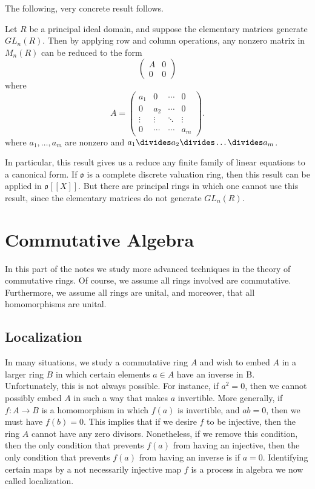 The following, very concrete result follows.

\begin{theorem}
    Let $R$ be a principal ideal domain, and suppose the elementary matrices generate $GL_n(R)$. Then by applying row and column operations, any nonzero matrix in $M_n(R)$ can be reduced to the form
    \[ \begin{pmatrix}
            A & 0 \\ 0 & 0
    \end{pmatrix} \]
    where
    \[ A = \begin{pmatrix} a_1 & 0 & \cdots & 0 \\ 0 & a_2 & \cdots & 0 \\ \vdots & \vdots & \ddots & \vdots \\ 0 & \cdots & \cdots & a_m \end{pmatrix}. \]
    where $a_1,\dots,a_m$ are nonzero and $a_1 \divides a_2 \divides \dots \divides a_m$.
\end{theorem}

In particular, this result gives us a reduce any finite family of linear equations to a canonical form. If $\mathfrak{o}$ is a complete discrete valuation ring, then this result can be applied in $\mathfrak{o}[[X]]$. But there are principal rings in which one cannot use this result, since the elementary matrices do not generate $GL_n(R)$.




\part{Commutative Algebra}

In this part of the notes we study more advanced techniques in the theory of commutative rings. Of course, we assume all rings involved are commutative. Furthermore, we assume all rings are unital, and moreover, that all homomorphisms are unital.

\chapter{Localization}

In many situations, we study a commutative ring $A$ and wish to embed $A$ in a larger ring $B$ in which certain elements $a \in A$ have an inverse in B. Unfortunately, this is not always possible. For instance, if $a^2 = 0$, then we cannot possibly embed $A$ in such a way that makes $a$ invertible. More generally, if $f:A \to B$ is a homomorphism in which $f(a)$ is invertible, and $ab = 0$, then we must have $f(b) = 0$. This implies that if we desire $f$ to be injective, then the ring $A$ cannot have any zero divisors. Nonetheless, if we remove this condition, then the only condition that prevents $f(a)$ from having an injective, then the only condition that prevents $f(a)$ from having an inverse is if $a = 0$. Identifying certain maps by a not necessarily injective map $f$ is a process in algebra we now called localization.

